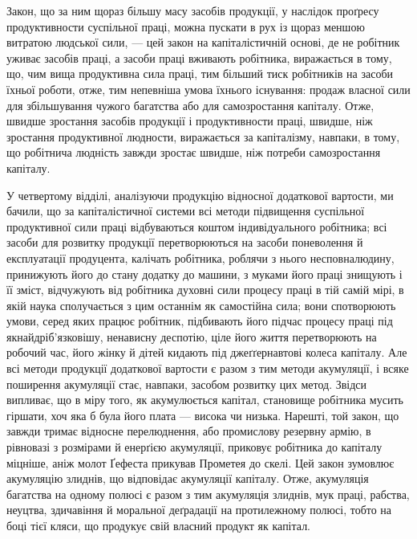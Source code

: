 Закон, що за ним щораз більшу масу засобів продукції, у
наслідок проґресу продуктивности суспільної праці, можна пускати
в рух із щораз меншою витратою людської сили, — цей
закон на капіталістичній основі, де не робітник уживає засобів
праці, а засоби праці вживають робітника, виражається в тому,
що, чим вища продуктивна сила праці, тим більший тиск робітників
на засоби їхньої роботи, отже, тим непевніша умова їхнього
існування: продаж власної сили для збільшування чужого багатства
або для самозростання капіталу. Отже, швидше зростання
засобів продукції і продуктивности праці, швидше, ніж
зростання продуктивної людности, виражається за капіталізму,
навпаки, в тому, що робітнича людність завжди зростає швидше,
ніж потреби самозростання капіталу.

У четвертому відділі, аналізуючи продукцію відносної додаткової
вартости, ми бачили, що за капіталістичної системи всі
методи підвищення суспільної продуктивної сили праці відбуваються
коштом індивідуального робітника; всі засоби для розвитку
продукції перетворюються на засоби поневолення й експлуатації
продуцента, калічать робітника, роблячи з нього несповналюдину,
принижують його до стану додатку до машини, з муками
його праці знищують і її зміст, відчужують від робітника духовні
сили процесу праці в тій самій мірі, в якій наука сполучається
з цим останнім як самостійна сила; вони спотворюють умови, серед
яких працює робітник, підбивають його підчас процесу праці
під якнайдріб’язковішу, ненависну деспотію, ціле його життя
перетворюють на робочий час, його жінку й дітей кидають під
джеґґернавтові колеса капіталу. Але всі методи продукції додаткової
вартости є разом з тим методи акумуляції, і всяке поширення
акумуляції стає, навпаки, засобом розвитку цих метод.
Звідси випливає, що в міру того, як акумулюється капітал,
становище робітника мусить гіршати, хоч яка б була його плата —
висока чи низька. Нарешті, той закон, що завжди тримає відносне
перелюднення, або промислову резервну армію, в рівновазі
з розмірами й енерґією акумуляції, приковує робітника до капіталу
міцніше, аніж молот Ґефеста прикував Прометея до скелі.
Цей закон зумовлює акумуляцію злиднів, що відповідає акумуляції
капіталу. Отже, акумуляція багатства на одному полюсі
є разом з тим акумуляція злиднів, мук праці, рабства, неуцтва,
здичавіння й моральної деґрадації на протилежному полюсі,
тобто на боці тієї кляси, що продукує свій власний продукт як
капітал.

